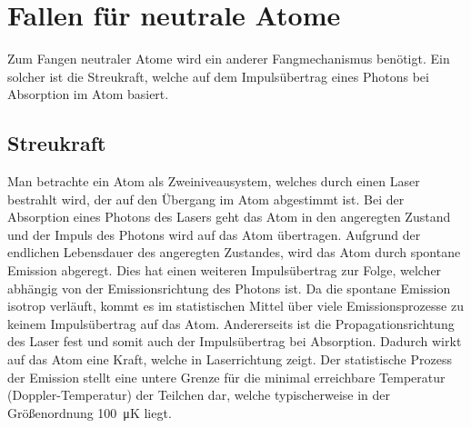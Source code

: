 \documentclass[twocolumn]{revtex4}
\begin{document}
\section{Fallen für neutrale Atome}
Zum Fangen neutraler Atome wird ein anderer Fangmechanismus benötigt.
Ein solcher ist die Streukraft, welche auf dem Impulsübertrag eines Photons bei Absorption im Atom basiert.

\subsection{Streukraft}
Man betrachte ein Atom als Zweiniveausystem, welches durch einen Laser bestrahlt wird, der auf den Übergang im Atom abgestimmt ist.
Bei der Absorption eines Photons des Lasers geht das Atom in den angeregten Zustand und der Impuls des Photons wird auf das Atom übertragen.
Aufgrund der endlichen Lebensdauer des angeregten Zustandes, wird das Atom durch spontane Emission abgeregt. 
Dies hat einen weiteren Impulsübertrag zur Folge, welcher abhängig von der Emissionsrichtung des Photons ist.
Da die spontane Emission isotrop verläuft, kommt es im statistischen Mittel über viele Emissionsprozesse zu keinem Impulsübertrag auf das Atom.
Andererseits ist die Propagationsrichtung des Laser fest und somit auch der Impulsübertrag bei Absorption.
Dadurch wirkt auf das Atom eine Kraft, welche in Laserrichtung zeigt.
Der statistische Prozess der Emission stellt eine untere Grenze für die minimal erreichbare Temperatur (Doppler-Temperatur) der Teilchen dar, welche typischerweise in der Größenordnung \SI{100}{\micro\kelvin} liegt.
\end{document}
